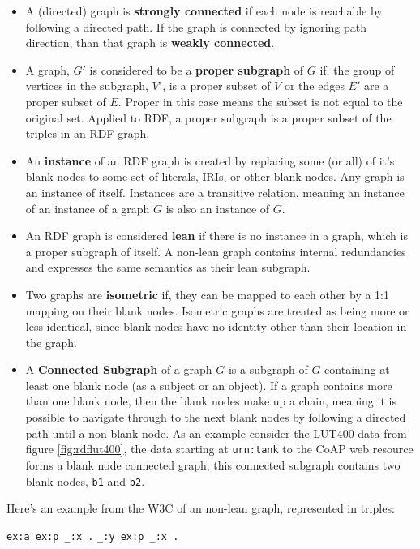 \begin{itemize}
    \item A (directed) graph is \textbf{strongly connected} if each node is reachable by following a directed path. If the graph is connected by ignoring path direction, than that graph is \textbf{weakly connected}.
    \item A graph, $G'$ is considered to be a \textbf{proper subgraph} of $G$ if, the group of vertices in the subgraph, $V'$, is a proper subset of $V$ or the edges $E'$ are a proper subset of $E$. Proper in this case means the subset is not equal to the original set. Applied to RDF, a proper subgraph is a proper subset of the triples in an RDF graph.
    \item An \textbf{instance} of an RDF graph is created by replacing some (or all) of it's blank nodes to some set of literals, IRIs, or other blank nodes. Any graph is an instance of itself. Instances are a transitive relation, meaning an instance of an instance of a graph $G$ is also an instance of $G$. \cite{RDFSemantics.Hayes.2014}
    \item An RDF graph is considered \textbf{lean} if there is no instance in a graph, which is a proper subgraph of itself. A non-lean graph contains internal redundancies and expresses the same semantics as their lean subgraph. \cite{RDFSemantics.Hayes.2014}
    \item Two graphs are \textbf{isometric} if, they can be mapped to each other by a 1:1 mapping on their blank nodes. Isometric graphs are treated as being more or less identical, since blank nodes have no identity other than their location in the graph. \cite{RDFSemantics.Hayes.2014}
    \item A \textbf{Connected Subgraph} of a graph $G$ is a subgraph of $G$ containing at least one blank node (as a subject or an object). If a graph contains more than one blank node, then the blank nodes make up a chain, meaning it is possible to navigate through to the next blank nodes by following a directed path until a non-blank node\cite{Esposito.2005}. As an example consider the LUT400 data from figure \ref{fig:rdflut400}, the data starting at \texttt{urn:tank} to the CoAP web resource forms a blank node connected graph; this connected subgraph contains two blank nodes, \texttt{b1} and \texttt{b2}.
\end{itemize}

Here's an example from the W3C\cite{RDFSemantics.Hayes.2014} of an non-lean graph, represented in triples: \newline
\begin{center}
\texttt{ex:a  ex:p  \_:x .} \newline
\texttt{\_:y  ex:p  \_:x .} \newline
\end{center}

